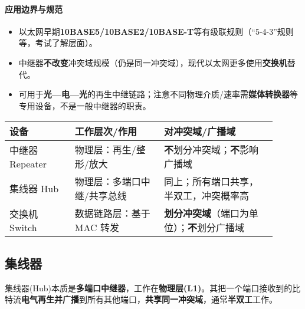 \documentclass[lang=cn,newtx,10pt,scheme=chinese]{../../elegantbook}
\begin{document}
\paragraph{应用边界与规范}
\begin{itemize}
    \item 以太网早期\textbf{10BASE5/10BASE2/10BASE-T}等有级联规则（“5-4-3”规则等，考试了解层面）。
    \item 中继器\textbf{不改变}冲突域规模（仍是同一冲突域），现代以太网更多使用\textbf{交换机}替代。
    \item 可用于\textbf{光—电—光}的再生中继链路；注意不同物理介质/速率需\textbf{媒体转换器}等专用设备，不是一般中继器的职责。
\end{itemize}

{\small\begin{longtable}{|p{0.22\linewidth}|p{0.30\linewidth}|p{0.38\linewidth}|}
\hline
	\textbf{设备} & \textbf{工作层次/作用} & \textbf{对冲突域/广播域} \\
\hline
中继器 Repeater & 物理层：再生/整形/放大 & \textbf{不}划分冲突域；\textbf{不}影响广播域 \\
\hline
集线器 Hub & 物理层：多端口中继/共享总线 & 同上；所有端口共享，半双工，冲突概率高 \\
\hline
交换机 Switch & 数据链路层：基于 MAC 转发 & \textbf{划分冲突域}（端口为单位）；\textbf{不}划分广播域 \\
\hline
\end{longtable}}

\begin{center}
{\setlength{\fboxsep}{6pt}%
}%
\end{center}
\subsection{集线器}
集线器(Hub)本质是\textbf{多端口中继器}，工作在\textbf{物理层(L1)}。其把一个端口接收到的比特流\textbf{电气再生并广播}到所有其他端口，\textbf{共享同一冲突域}，通常\textbf{半双工}工作。
\end{document}

